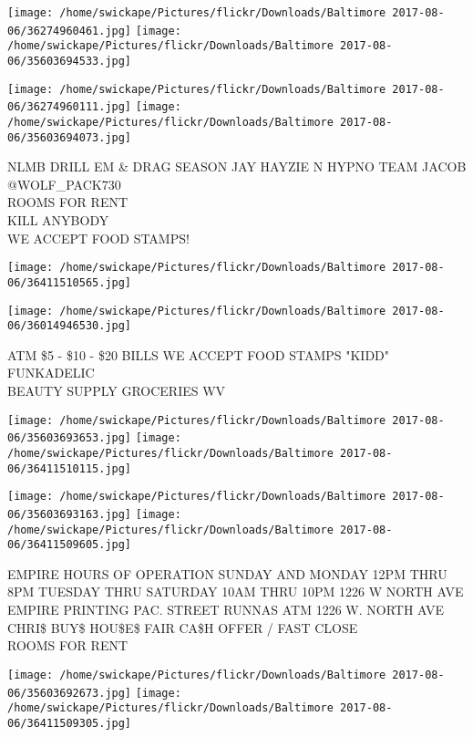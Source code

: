 \documentclass[10pt,letterpaper]{article}
\begin{document}
\texttt{[image: /home/swickape/Pictures/flickr/Downloads/Baltimore 2017-08-06/36274960461.jpg]}
\texttt{[image: /home/swickape/Pictures/flickr/Downloads/Baltimore 2017-08-06/35603694533.jpg]}

\texttt{[image: /home/swickape/Pictures/flickr/Downloads/Baltimore 2017-08-06/36274960111.jpg]}
\texttt{[image: /home/swickape/Pictures/flickr/Downloads/Baltimore 2017-08-06/35603694073.jpg]}

NLMB DRILL EM \& DRAG SEASON JAY HAYZIE N HYPNO TEAM JACOB @WOLF\_PACK730\\
ROOMS FOR RENT\\
KILL ANYBODY\\
WE ACCEPT FOOD STAMPS!
\pagebreak

\texttt{[image: /home/swickape/Pictures/flickr/Downloads/Baltimore 2017-08-06/36411510565.jpg]}

\vspace{0.25in}
\texttt{[image: /home/swickape/Pictures/flickr/Downloads/Baltimore 2017-08-06/36014946530.jpg]}

ATM \$5 {-} \$10 {-} \$20 BILLS WE ACCEPT FOOD STAMPS "KIDD" FUNKADELIC\\
BEAUTY SUPPLY GROCERIES WV
\pagebreak

\texttt{[image: /home/swickape/Pictures/flickr/Downloads/Baltimore 2017-08-06/35603693653.jpg]}
\texttt{[image: /home/swickape/Pictures/flickr/Downloads/Baltimore 2017-08-06/36411510115.jpg]}

\texttt{[image: /home/swickape/Pictures/flickr/Downloads/Baltimore 2017-08-06/35603693163.jpg]}
\texttt{[image: /home/swickape/Pictures/flickr/Downloads/Baltimore 2017-08-06/36411509605.jpg]}

EMPIRE HOURS OF OPERATION SUNDAY AND MONDAY 12PM THRU 8PM TUESDAY THRU SATURDAY 10AM THRU 10PM 1226 W NORTH AVE\\
EMPIRE PRINTING PAC. STREET RUNNAS ATM 1226 W. NORTH AVE\\
CHRI\$ BUY\$ HOU\$E\$ FAIR CA\$H OFFER / FAST CLOSE\\
ROOMS FOR RENT
\pagebreak

\texttt{[image: /home/swickape/Pictures/flickr/Downloads/Baltimore 2017-08-06/35603692673.jpg]}
\texttt{[image: /home/swickape/Pictures/flickr/Downloads/Baltimore 2017-08-06/36411509305.jpg]}
\end{document}
